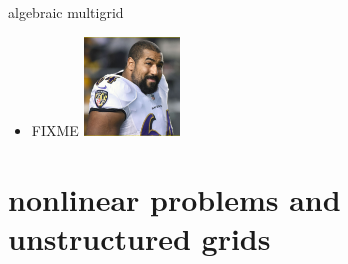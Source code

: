 \documentclass[hide notes,intlimits,usenames,dvipsnames]{beamer}
\begin{document}
\begin{frame}{algebraic multigrid}
\begin{itemize}
\item FIXME   \includegraphics[width=0.2\textwidth]{figs/urschel}
\end{itemize}
\end{frame}



\section{nonlinear problems and unstructured grids}
\end{document}
